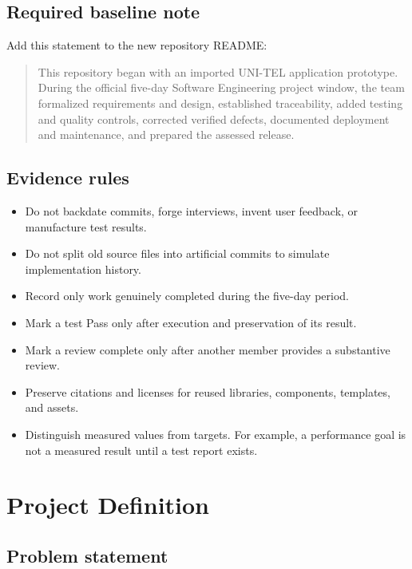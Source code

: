 \documentclass[
  10pt,
  a4paper,
  oneside]{report}
\providecommand{\tightlist}{%
  \setlength{\itemsep}{0pt}\setlength{\parskip}{0pt}}
\begin{document}
\section{Required baseline note}\label{32-required-baseline-note}

Add this statement to the new repository README:

\begin{quote}
This repository began with an imported UNI-TEL application prototype.
During the official five-day Software Engineering project window, the
team formalized requirements and design, established traceability, added
testing and quality controls, corrected verified defects, documented
deployment and maintenance, and prepared the assessed release.
\end{quote}

\section{Evidence rules}\label{33-evidence-rules}

\begin{itemize}
\tightlist
\item
  Do not backdate commits, forge interviews, invent user feedback, or
  manufacture test results.
\item
  Do not split old source files into artificial commits to simulate
  implementation history.
\item
  Record only work genuinely completed during the five-day period.
\item
  Mark a test Pass only after execution and preservation of its result.
\item
  Mark a review complete only after another member provides a
  substantive review.
\item
  Preserve citations and licenses for reused libraries, components,
  templates, and assets.
\item
  Distinguish measured values from targets. For example, a performance
  goal is not a measured result until a test report exists.
\end{itemize}

\chapter{Project Definition}\label{4-project-definition}

\section{Problem statement}\label{41-problem-statement}
\end{document}
